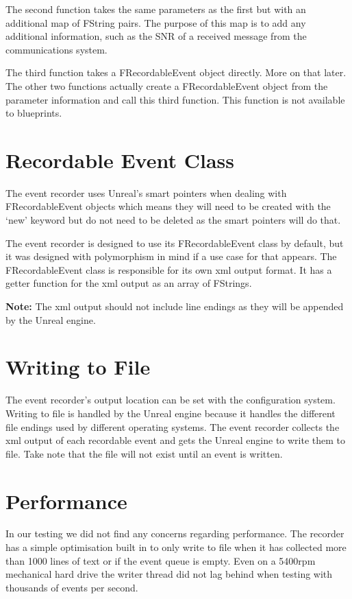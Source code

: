 \documentclass[../main.tex]{subfiles}
\begin{document}
The second function takes the same parameters as the first but with an additional map of FString pairs.
The purpose of this map is to add any additional information, such as the SNR of a received message from the communications system.

The third function takes a FRecordableEvent object directly.
More on that later.
The other two functions actually create a FRecordableEvent object from the parameter information and call this third function.
This function is not available to blueprints.

\section{Recordable Event Class}
The event recorder uses Unreal's smart pointers when dealing with FRecordableEvent objects which means they will need to be created with the `new' keyword but do not need to be deleted as the smart pointers will do that.

The event recorder is designed to use its FRecordableEvent class by default, but it was designed with polymorphism in mind if a use case for that appears.
The FRecordableEvent class is responsible for its own xml output format.
It has a getter function for the xml output as an array of FStrings.

\textbf{Note:} The xml output should not include line endings as they will be appended by the Unreal engine.

\section{Writing to File}
The event recorder's output location can be set with the configuration system.
Writing to file is handled by the Unreal engine because it handles the different file endings used by different operating systems.
The event recorder collects the xml output of each recordable event and gets the Unreal engine to write them to file.
Take note that the file will not exist until an event is written.

\section{Performance}
In our testing we did not find any concerns regarding performance.
The recorder has a simple optimisation built in to only write to file when it has collected more than 1000 lines of text or if the event queue is empty.
Even on a 5400rpm mechanical hard drive the writer thread did not lag behind when testing with thousands of events per second.
\end{document}

